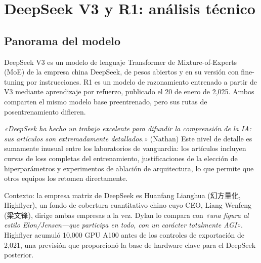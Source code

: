 \section{DeepSeek V3 y R1: análisis técnico}

\subsection{Panorama del modelo}

DeepSeek V3 es un modelo de lenguaje Transformer de Mixture-of-Experts (MoE) de la empresa china DeepSeek, de pesos abiertos y en su versión con fine-tuning por instrucciones. R1 es un modelo de razonamiento entrenado a partir de V3 mediante aprendizaje por refuerzo, publicado el 20 de enero de 2,025. Ambos comparten el mismo modelo base preentrenado, pero sus rutas de posentrenamiento difieren.

\textit{«DeepSeek ha hecho un trabajo excelente para difundir la comprensión de la IA: sus artículos son extremadamente detallados.»} (Nathan) Este nivel de detalle es sumamente inusual entre los laboratorios de vanguardia: los artículos incluyen curvas de loss completas del entrenamiento, justificaciones de la elección de hiperparámetros y experimentos de ablación de arquitectura, lo que permite que otros equipos los retomen directamente.

Contexto: la empresa matriz de DeepSeek es Huanfang Lianghua (幻方量化, Highflyer), un fondo de cobertura cuantitativo chino cuyo CEO, Liang Wenfeng (梁文锋), dirige ambas empresas a la vez. Dylan lo compara con \textit{«una figura al estilo Elon/Jensen—que participa en todo, con un carácter totalmente AGI»}. Highflyer acumuló 10,000 GPU A100 antes de los controles de exportación de 2,021, una previsión que proporcionó la base de hardware clave para el DeepSeek posterior.

